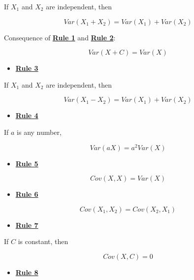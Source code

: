 \documentclass[
]{book}
\providecommand{\tightlist}{%
  \setlength{\itemsep}{0pt}\setlength{\parskip}{0pt}}
\begin{document}
If \(X_{1}\) and \(X_{2}\) are independent, then

\[
Var\left(X_{1} + X_{2}\right) =
Var\left(X_{1}\right) + Var\left(X_{2}\right)
\]

Consequence of \href{./variance.html\#Rule1}{\textbf{Rule 1}} and \href{./variance.html\#Rule2}{\textbf{Rule 2}}:

\[
Var\left(X + C\right) = Var\left(X\right)
\]

\begin{itemize}
\tightlist
\item
  \href{./variance.html\#Rule3}{\textbf{Rule 3}}
\end{itemize}

If \(X_{1}\) and \(X_{2}\) are independent, then

\[
Var\left(X_{1} - X_{2}\right) =
Var\left(X_{1}\right) + Var\left(X_{2}\right)
\]

\begin{itemize}
\tightlist
\item
  \href{./variance.html\#Rule4}{\textbf{Rule 4}}
\end{itemize}

If \(a\) is any number,

\[
Var\left(aX\right) = a^2 Var\left(X\right)
\]

\begin{itemize}
\tightlist
\item
  \href{./covariance.html\#Rule5}{\textbf{Rule 5}}
\end{itemize}

\[
Cov(X, X) = Var(X)
\]

\begin{itemize}
\tightlist
\item
  \href{./covariance.html\#Rule6}{\textbf{Rule 6}}
\end{itemize}

\[
Cov\left(X_{1}, X_{2}\right) = Cov\left(X_{2}, X_{1}\right)
\]

\begin{itemize}
\tightlist
\item
  \href{./covariance.html\#Rule7}{\textbf{Rule 7}}
\end{itemize}

If \(C\) is constant, then

\[
Cov\left(X, C\right) = 0
\]

\begin{itemize}
\tightlist
\item
  \href{./covariance.html\#Rule8}{\textbf{Rule 8}}
\end{itemize}
\end{document}
